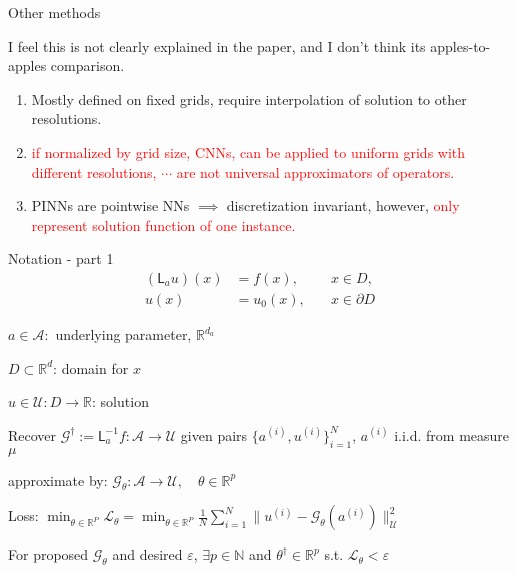 \documentclass[usenames,dvipsnames]{beamer}
\theoremstyle{definition}
\begin{document}
\begin{frame}{Other methods}

    I feel this is not clearly explained in the paper, and I don't think its apples-to-apples comparison.
    \begin{enumerate}
        \item Mostly defined on fixed grids, require interpolation of solution to other resolutions.

        \item \textcolor{red}{if normalized by grid size, CNNs, can be applied to uniform grids with different resolutions, 
        $\cdots$ are not universal approximators of operators.}

        \item PINNs are pointwise NNs $\implies$ discretization invariant, however, \textcolor{red}{only represent solution function of one instance.}
    \end{enumerate}
\end{frame}

\begin{frame}{Notation - part 1}
    $$\begin{aligned}(\mathsf L_au)(x)&=f(x),\quad&x\in D,\\u(x)&=u_0(x),\quad&x\in\partial D\end{aligned}$$

    $a \in \mathcal{A}: $ underlying parameter, $\mathbb{R}^{d_a}$
    
    $D \subset \mathbb{R}^d$: domain for $x$
    
    $u \in \mathcal{U}: D \rightarrow \mathbb{R}$: solution

    Recover $\mathcal{G}^{\dagger}:=\mathsf{L}_{a}^{-1}f:\mathcal{A}\rightarrow\mathcal{U}$ given pairs $\{a^{(i)}, u^{(i)}\}_{i=1}^{N}$, $a^{(i)}$ i.i.d. from measure $\mu$ \textcolor{red}{}

    approximate by: $\mathcal{G}_{\theta}:\mathcal{A}\rightarrow\mathcal{U},\quad\theta\in\mathbb{R}^{p}$

     Loss: $\min_{\theta\in\mathbb{R}^{P}} \mathcal{L}_{\theta} =\min_{\theta\in\mathbb{R}^{P}}\frac{1}{N}\sum_{i=1}^{N}\|u^{(i)}-\mathcal{G}_{\theta}(a^{(i)})\|_{\mathcal{U}}^{2}$

    For proposed $\mathcal{G}_{\theta}$ and desired $\varepsilon$, $\exists p \in \mathbb{N}$ and $\theta^{\dagger} \in \mathbb{R}^{p}$ s.t. $\mathcal{L}_{\theta} < \varepsilon$
\end{frame}
\end{document}
